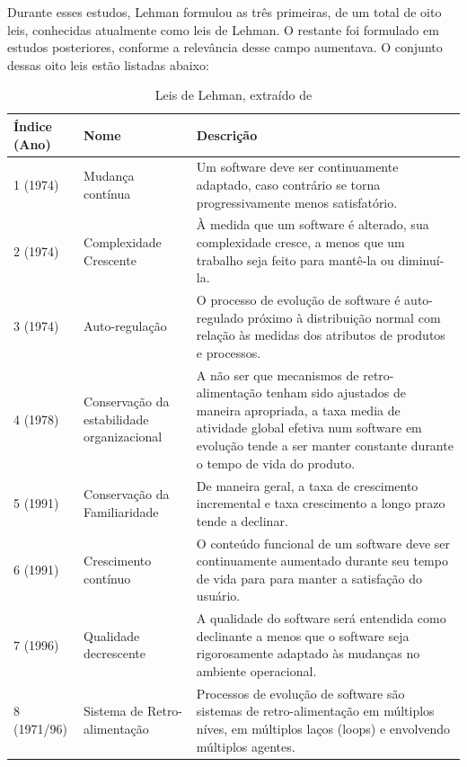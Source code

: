 Durante esses estudos, Lehman formulou as três primeiras, de um total de oito leis, conhecidas atualmente como leis de Lehman. O restante foi formulado em estudos posteriores, conforme a relevância desse campo aumentava. O conjunto dessas oito leis estão listadas abaixo:
\begin{table}[H]
\begin{center}
    \begin{tabular}{ | l | p{4cm} | p{9cm} |}
    \hline
    Índice (Ano) & Nome & Descrição \\ \hline
    1 (1974) & Mudança contínua & Um software deve ser continuamente adaptado, caso contrário se torna progressivamente menos satisfatório. \\ \hline
    2 (1974) & Complexidade Crescente & À medida que um software é alterado, sua complexidade cresce, a menos que um trabalho seja feito para mantê-la ou diminuí-la. \\ \hline
    3 (1974) & Auto-regulação & O processo de evolução de software é auto-regulado próximo à distribuição normal com relação às medidas dos atributos de produtos e processos. \\ \hline
    4 (1978) & Conservação da estabilidade organizacional & A não ser que mecanismos de retro-alimentação tenham sido ajustados de maneira apropriada, a taxa media de atividade global efetiva num software em evolução tende a ser manter constante durante o tempo de vida do produto. \\ \hline
    5 (1991) & Conservação da Familiaridade & De maneira geral, a taxa de crescimento incremental e taxa crescimento a longo prazo tende a declinar. \\ \hline
    6 (1991) & Crescimento contínuo & O conteúdo funcional de um software deve ser continuamente aumentado durante seu tempo de vida para para manter a satisfação do usuário. \\ \hline
    7 (1996) & Qualidade decrescente & A qualidade do software será entendida como declinante a menos que o software seja rigorosamente adaptado às mudanças no ambiente operacional. \\ \hline
    8 (1971/96) & Sistema de Retro-alimentação & Processos de evolução de software são sistemas de retro-alimentação em múltiplos níves, em múltiplos laços (loops) e envolvendo múltiplos agentes. \\ \hline
    \end{tabular}
    \caption{Leis de Lehman, extraído de \cite{fernandez2008empirical}}
    \label{tab-leis-lehman}
\end{center}
\end{table}

